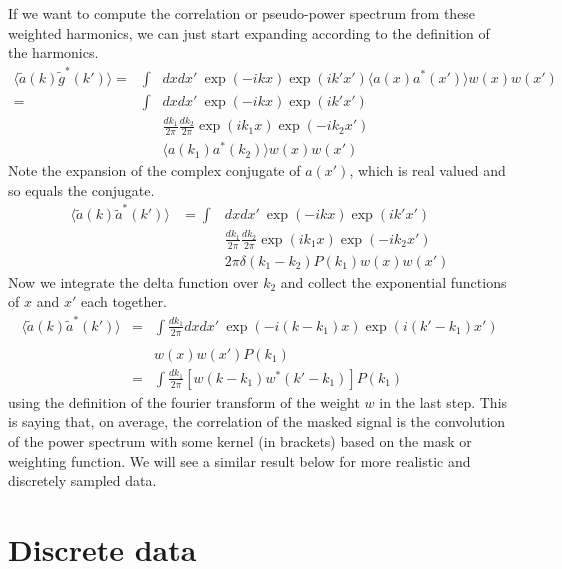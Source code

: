 If we want to compute the correlation or pseudo-power spectrum from these weighted harmonics, we can just start expanding according to the definition of the harmonics.
\begin{eqnarray}
  \langle \tilde a(k) \tilde g^*(k') \rangle = &\int& dx dx' \ \exp(-i k x)\exp(i k' x') \langle a(x) a^*(x') \rangle w(x) w(x')  \nonumber \\
  = &\int &dx dx' \ \exp(-i k x)\exp(i k' x')  \nonumber \\
  & & \frac{dk_1}{2\pi} \frac{dk_2}{2\pi} \exp(i k_1 x)\exp(-i k_2 x')  \nonumber \\
  & & \langle a(k_1) a^*(k_2) \rangle w(x) w(x')  
\end{eqnarray}
Note the expansion of the complex conjugate of $a(x')$, which is real valued and so equals the conjugate.
 \begin{eqnarray}
   \langle \tilde a(k) \tilde a^*(k') \rangle  &= \int &dx dx' \ \exp(-i k x)\exp(i k' x')  \nonumber \\
  & &\frac{dk_1}{2\pi} \frac{dk_2}{2\pi} \exp(i k_1 x)\exp(-i k_2 x')  \nonumber \\
  & & 2\pi \delta(k_1 - k_2) P(k_1) w(x) w(x') 
\end{eqnarray}
Now we integrate the delta function over $k_2$ and collect the exponential functions of $x$ and $x'$ each together.
 \begin{eqnarray}
   \langle \tilde a(k) \tilde a^*(k') \rangle  &= & \int\frac{dk_1}{2\pi} dx dx' \ \exp(-i (k - k_1) x)\exp(i (k'-k_1) x')  \nonumber \\
  & &  \nonumber \\
   & &  w(x) w(x') P(k_1) \nonumber \\
   &=&  \int\frac{dk_1}{2\pi} \left[  w(k-k_1) w^*(k'-k_1) \right] P(k_1) %
\end{eqnarray}
using the definition of the fourier transform of the weight $w$ in the last step.  This is saying that, on average, the correlation of the masked signal is the convolution of the power spectrum with some kernel (in brackets) based on the mask or weighting function.  We will see a similar result below for more realistic and discretely sampled data.

\section{Discrete data}

